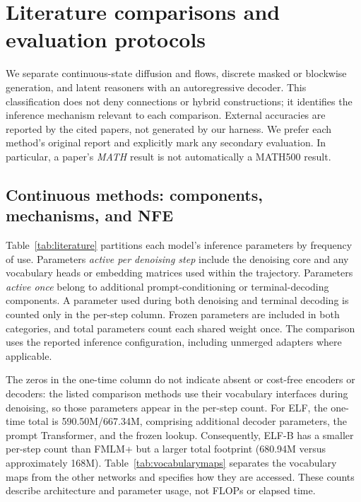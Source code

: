 \section{Literature comparisons and evaluation protocols}
\label{app:literature}
We separate continuous-state diffusion and flows, discrete masked or blockwise generation, and latent reasoners with an autoregressive decoder. This classification does not deny connections or hybrid constructions; it identifies the inference mechanism relevant to each comparison. External accuracies are reported by the cited papers, not generated by our harness. We prefer each method's original report and explicitly mark any secondary evaluation. In particular, a paper's \emph{MATH} result is not automatically a MATH500 result.

\subsection{Continuous methods: components, mechanisms, and NFE}
\label{app:literaturecontinuous}
Table~\ref{tab:literature} partitions each model's inference parameters by frequency of use. Parameters \emph{active per denoising step} include the denoising core and any vocabulary heads or embedding matrices used within the trajectory. Parameters \emph{active once} belong to additional prompt-conditioning or terminal-decoding components. A parameter used during both denoising and terminal decoding is counted only in the per-step column. Frozen parameters are included in both categories, and total parameters count each shared weight once. The comparison uses the reported inference configuration, including unmerged adapters where applicable.

The zeros in the one-time column do not indicate absent or cost-free encoders or decoders: the listed comparison methods use their vocabulary interfaces during denoising, so those parameters appear in the per-step count. For ELF, the one-time total is 590.50M/667.34M, comprising additional decoder parameters, the prompt Transformer, and the frozen lookup. Consequently, ELF-B has a smaller per-step count than FMLM+ but a larger total footprint (680.94M versus approximately 168M). Table~\ref{tab:vocabularymaps} separates the vocabulary maps from the other networks and specifies how they are accessed. These counts describe architecture and parameter usage, not FLOPs or elapsed time.



